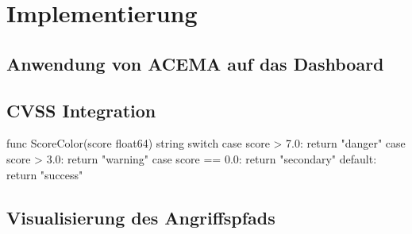 \chapter{Implementierung}
\label{chap:implementierung}
\section[Anwendung von ACEMA]{Anwendung von ACEMA auf das Dashboard}
\label{sec:anwendungVonAcema}
\section{CVSS Integration}
\label{sec:cvssIntegration}

\begin{code}[caption={Quellcode zur farblichen Kategorisierung von Schweregraden}]
func ScoreColor(score float64) string {
    switch {
    case score > 7.0:
        return "danger"
    case score > 3.0:
        return "warning"
    case score == 0.0:
        return "secondary"
    default:
        return "success"
    }
}
\end{code}

\section{Visualisierung des Angriffspfads}
\label{sec:visualisierungDesAngriffspfads}